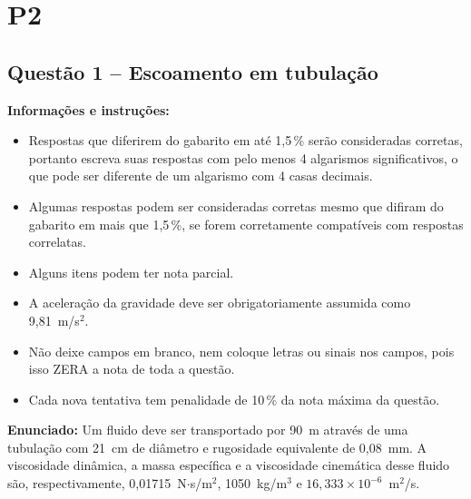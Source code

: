 \documentclass[11pt,a4paper]{article}
\begin{document}
\noindent{}

\newpage

\section*{P2}

\subsection*{Questão 1 -- Escoamento em tubulação}

\textbf{Informações e instruções:}
\begin{itemize}
    \item Respostas que diferirem do gabarito em até 1,5\,\% serão consideradas corretas, portanto escreva suas respostas com pelo menos 4 algarismos significativos, o que pode ser diferente de um algarismo com 4 casas decimais.
    \item Algumas respostas podem ser consideradas corretas mesmo que difiram do gabarito em mais que 1,5\,\%, se forem corretamente compatíveis com respostas correlatas.
    \item Alguns itens podem ter nota parcial.
    \item A aceleração da gravidade deve ser obrigatoriamente assumida como 9,81~m/s$^2$.
    \item Não deixe campos em branco, nem coloque letras ou sinais nos campos, pois isso ZERA a nota de toda a questão.
    \item Cada nova tentativa tem penalidade de 10\,\% da nota máxima da questão.
\end{itemize}

\textbf{Enunciado:} Um fluido deve ser transportado por 90~m através de uma tubulação com 21~cm de diâmetro e rugosidade equivalente de 0,08~mm. A viscosidade dinâmica, a massa específica e a viscosidade cinemática desse fluido são, respectivamente, 0,01715~N$\cdot$s/m$^2$, 1050~kg/m$^3$ e $16{,}333 \times 10^{-6}$~m$^2$/s.
\end{document}
